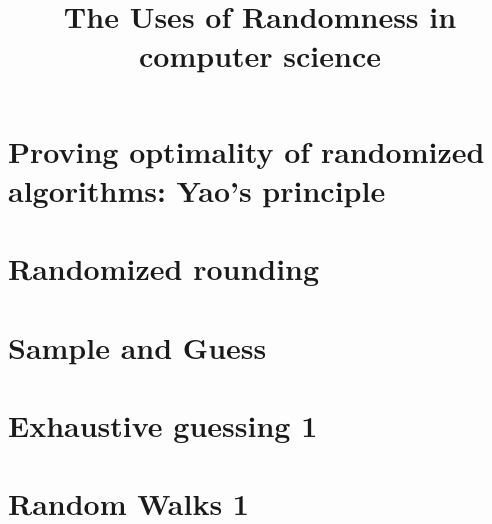 \documentclass{article}
\title{The Uses of Randomness in computer science}
\theoremstyle{plain}
\theoremstyle{remark}
\numberwithin{equation}{section}
\begin{document}
\maketitle
\tableofcontents
\newpage

\newpage

\newpage

\newpage
\section{Proving optimality of randomized algorithms: Yao's principle}

\newpage

\newpage
\section{Randomized rounding}

\newpage
\section{Sample and Guess}

\newpage

\newpage

\newpage
\section{Exhaustive guessing 1}
\section{Random Walks 1}

\appendix




\end{document}
